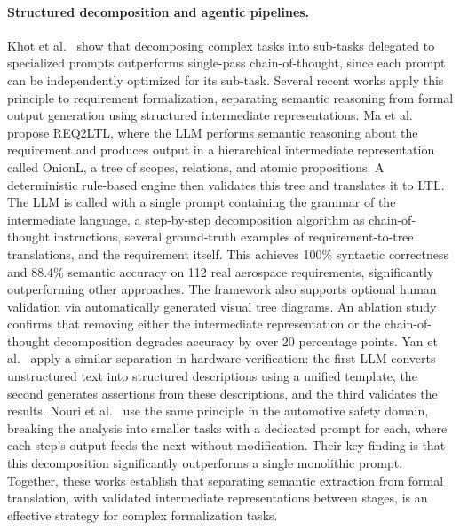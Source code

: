 \paragraph{Structured decomposition and agentic pipelines.}
Khot et al.~\cite{khot2022decomposed} show that decomposing complex tasks
into sub-tasks delegated to specialized prompts outperforms single-pass
chain-of-thought, since each prompt can be independently optimized for its
sub-task. Several recent works apply this principle to requirement
formalization, separating semantic reasoning from formal output generation
using structured intermediate representations.
Ma et al.~\cite{ma2025req2ltl} propose REQ2LTL, where the LLM performs
semantic reasoning about the requirement and produces output in a
hierarchical intermediate representation called OnionL, a tree of scopes,
relations, and atomic propositions. A deterministic rule-based engine then
validates this tree and translates it to LTL. The LLM is called with a
single prompt containing the grammar of the intermediate language, a
step-by-step decomposition algorithm as chain-of-thought instructions,
several ground-truth examples of requirement-to-tree translations, and the
requirement itself. This achieves 100\% syntactic correctness and 88.4\%
semantic accuracy on 112 real aerospace requirements, significantly
outperforming other approaches. The framework also supports optional human
validation via automatically generated visual tree diagrams. An ablation
study confirms that removing either the intermediate representation or
the chain-of-thought decomposition degrades accuracy by over 20
percentage points. Yan et al.~\cite{yan2025assertllm} apply a similar
separation in hardware verification: the first LLM converts unstructured
text into structured descriptions using a unified template, the second
generates assertions from these descriptions, and the third validates the
results. Nouri et al.~\cite{nouri2024safety} use the same principle in
the automotive safety domain, breaking the analysis into smaller tasks
with a dedicated prompt for each, where each step's output feeds the next
without modification. Their key finding is that this decomposition
significantly outperforms a single monolithic prompt. Together, these
works establish that separating semantic extraction from formal
translation, with validated intermediate representations between stages,
is an effective strategy for complex formalization tasks.

